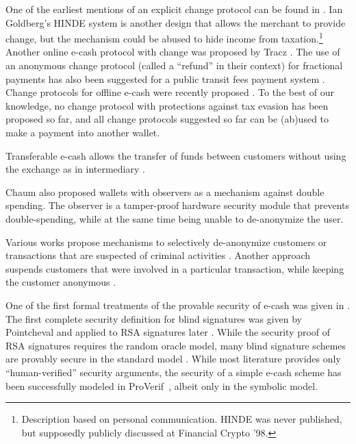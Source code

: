 One of the earliest mentions of an explicit change protocol can be found in
\cite{brickell1995trustee}.  Ian Goldberg's HINDE system is another design that
allows the merchant to provide change, but the mechanism could be abused to
hide income from taxation.\footnote{Description based on personal
communication. HINDE was never published, but supposedly publicly discussed at
Financial Crypto '98.}  Another online e-cash protocol with change was proposed
by Tracz \cite{tracz2001fair}.  The use of an anonymous change protocol (called
a ``refund'' in their context) for fractional payments has also been suggested
for a public transit fees payment system \cite{rupp2013p4r}.  Change protocols
for offline e-cash were recently proposed \cite{batten2018offline}.  To the
best of our knowledge, no change protocol with protections against tax evasion
has been proposed so far, and all change protocols suggested so far can be
(ab)used to make a payment into another wallet.

Transferable e-cash allows the transfer of funds between customers without
using the exchange as in intermediary \cite{fuchsbauer2009transferable}.

Chaum also proposed wallets with observers \cite{chaum1992wallet} as a
mechanism against double spending.  The observer is a tamper-proof hardware
security module that prevents double-spending, while at the same time being
unable to de-anonymize the user.

Various works propose mechanisms to selectively de-anonymize customers or
transactions that are suspected of criminal activities
\cite{stadler1995fair,davida1997anonymity}.  Another approach suspends
customers that were involved in a particular transaction, while keeping the
customer anonymous \cite{au2011electronic}.

One of the first formal treatments of the provable security of e-cash was given
in \cite{damgaard2007proof}.  The first complete security definition for blind
signatures was given by Pointcheval \cite{pointcheval1996provably} and applied
to RSA signatures later \cite{pointcheval2000security}.  While the security
proof of RSA signatures requires the random oracle model, many blind signature
schemes are provably secure in the standard model
\cite{izabachene2013divisible,pointcheval2017cut}.  While most literature
provides only ``human-verified'' security arguments, the security of a simple
e-cash scheme has been successfully modeled in
ProVerif~\cite{dreier2015formal}, albeit only in the symbolic model.


